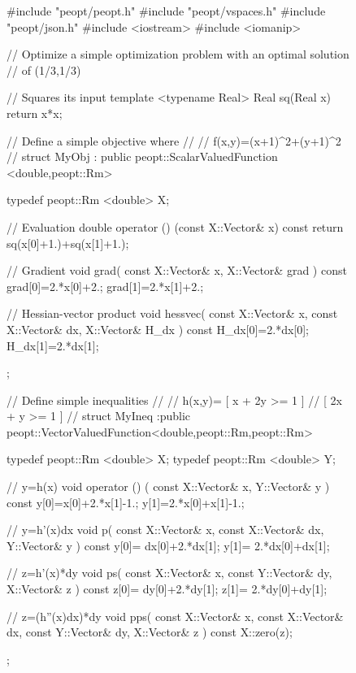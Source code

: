 \documentclass{report}
\begin{document}
\begin{figure}
\begin{lstCpp}
#include "peopt/peopt.h"
#include "peopt/vspaces.h"
#include "peopt/json.h"
#include <iostream>
#include <iomanip>

// Optimize a simple optimization problem with an optimal solution
// of (1/3,1/3)

// Squares its input
template <typename Real>
Real sq(Real x){
    return x*x;
}

// Define a simple objective where 
// 
// f(x,y)=(x+1)^2+(y+1)^2
//
struct MyObj
    : public peopt::ScalarValuedFunction <double,peopt::Rm>
{
    typedef peopt::Rm <double> X;

    // Evaluation 
    double operator () (const X::Vector& x) const {
        return sq(x[0]+1.)+sq(x[1]+1.);
    }

    // Gradient
    void grad(
        const X::Vector& x,
        X::Vector& grad
    ) const {
        grad[0]=2.*x[0]+2.;
        grad[1]=2.*x[1]+2.;
    }

    // Hessian-vector product
    void hessvec(
        const X::Vector& x,
        const X::Vector& dx,
        X::Vector& H_dx
    ) const {
        H_dx[0]=2.*dx[0];
        H_dx[1]=2.*dx[1];
    }
};
\end{lstCpp}
\end{figure}
\begin{figure}
\ContinuedFloat
\begin{lstCpp}
// Define simple inequalities 
//
// h(x,y)= [ x + 2y >= 1 ] 
//         [ 2x + y >= 1 ] 
//
struct MyIneq
    :public peopt::VectorValuedFunction<double,peopt::Rm,peopt::Rm>
{
    typedef peopt::Rm <double> X;
    typedef peopt::Rm <double> Y;

    // y=h(x) 
    void operator () (
        const X::Vector& x,
        Y::Vector& y
    ) const {
        y[0]=x[0]+2.*x[1]-1.;
        y[1]=2.*x[0]+x[1]-1.;
    }
    
    // y=h'(x)dx
    void p(
        const X::Vector& x,
        const X::Vector& dx,
        Y::Vector& y
    ) const { 
        y[0]= dx[0]+2.*dx[1];
        y[1]= 2.*dx[0]+dx[1];
    }
    
    // z=h'(x)*dy
    void ps(
        const X::Vector& x,
        const Y::Vector& dy,
        X::Vector& z
    ) const { 
        z[0]= dy[0]+2.*dy[1];
        z[1]= 2.*dy[0]+dy[1];
    }
    
    // z=(h''(x)dx)*dy
    void pps( 
        const X::Vector& x,
        const X::Vector& dx,
        const Y::Vector& dy,
        X::Vector& z
    ) const {
        X::zero(z);
    }
};
\end{lstCpp}
\end{figure}
\end{document}
